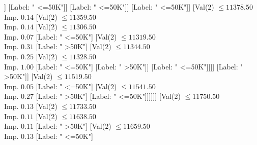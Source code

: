 \documentclass[margin=10pt]{standalone}
\begin{document}
\begin{forest}
																													[Val($2$) $ \leq 11205.50$ \\ Imp. $0.03$
																														[Val($2$) $ \leq 11187.50$ \\ Imp. $0.06$
																															[Val($2$) $ \leq 11027.50$ \\ Imp. $0.07$
																																[Val($2$) $ \leq 11016.50$ \\ Imp. $0.54$
																																	[Label: " <=50K"]
																																	[Label: " >50K"]]
																																[Label: " <=50K"]]
																															[Label: " <=50K"]]
																														[Label: " <=50K"]]
																													[Val($2$) $ \leq 11378.50$ \\ Imp. $0.14$
																														[Val($2$) $ \leq 11359.50$ \\ Imp. $0.14$
																															[Val($2$) $ \leq 11306.50$ \\ Imp. $0.07$
																																[Label: " <=50K"]
																																[Val($2$) $ \leq 11319.50$ \\ Imp. $0.31$
																																	[Label: " >50K"]
																																	[Val($2$) $ \leq 11344.50$ \\ Imp. $0.25$
																																		[Val($2$) $ \leq 11328.50$ \\ Imp. $1.00$
																																			[Label: " <=50K"]
																																			[Label: " >50K"]]
																																		[Label: " <=50K"]]]]
																															[Label: " >50K"]]
																														[Val($2$) $ \leq 11519.50$ \\ Imp. $0.05$
																															[Label: " <=50K"]
																															[Val($2$) $ \leq 11541.50$ \\ Imp. $0.27$
																																[Label: " >50K"]
																																[Label: " <=50K"]]]]]]
																											[Val($2$) $ \leq 11750.50$ \\ Imp. $0.13$
																												[Val($2$) $ \leq 11733.50$ \\ Imp. $0.11$
																													[Val($2$) $ \leq 11638.50$ \\ Imp. $0.11$
																														[Label: " >50K"]
																														[Val($2$) $ \leq 11659.50$ \\ Imp. $0.13$
																															[Label: " <=50K"]

\end{forest}
\end{document}
